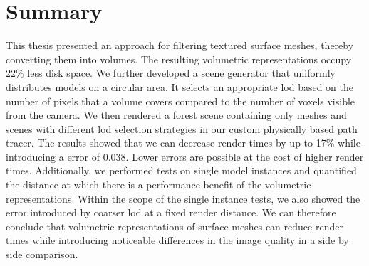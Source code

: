 \chapter{Summary}
\label{chap:summary}
This thesis presented an approach for filtering textured surface meshes, thereby converting them into volumes.
The resulting volumetric representations occupy 22\% less disk space.
We further developed a scene generator that uniformly distributes models on a circular area.
It selects an appropriate \ac{lod} based on the number of pixels that a volume covers compared to the number of voxels visible from the camera.
We then rendered a forest scene containing only meshes and scenes with different \ac{lod} selection strategies in our custom physically based path tracer.
The results showed that we can decrease render times by up to 17\% while introducing a \FLIP error of 0.038.
Lower \FLIP errors are possible at the cost of higher render times.
Additionally, we performed tests on single model instances and quantified the distance at which there is a performance benefit of the volumetric representations.
Within the scope of the single instance tests, we also showed the error introduced by coarser \ac{lod} at a fixed render distance.
We can therefore conclude that volumetric representations of surface meshes can reduce render times while introducing noticeable differences in the image quality in a side by side comparison.